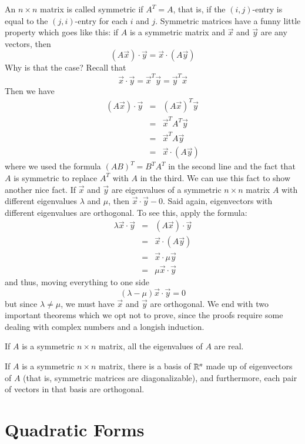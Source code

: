 \documentclass[Main.tex]{subfiles}
\begin{document}
An $n\times n$ matrix is called symmetric if $A^T=A$, that is, if the $(i,j)$-entry is equal to the $(j,i)$-entry for each $i$ and $j$.
Symmetric matrices have a funny little property which goes like this: if $A$ is a symmetric matrix and $\vec{x}$ and $\vec{y}$ are any vectors, then
\[(A\vec{x})\cdot\vec{y} = \vec{x}\cdot (A\vec{y})\]
Why is that the case?
Recall that
\[\vec{x}\cdot \vec{y} = \vec{x}^T\vec{y} = \vec{y}^T\vec{x}\]
Then we have
\begin{eqnarray*}
  (A\vec{x})\cdot\vec{y} &=& (A\vec{x})^T\vec{y} \\
  &=& \vec{x}^TA^T\vec{y}\\
  &=& \vec{x}^TA\vec{y}\\
  &=& \vec{x}\cdot (A\vec{y})
\end{eqnarray*}
where we used the formula $(AB)^T=B^TA^T$ in the second line and the fact that $A$ is symmetric to replace $A^T$ with $A$ in the third.
We can use this fact to show another nice fact.  If $\vec{x}$ and $\vec{y}$ are eigenvalues of a symmetric $n\times n$ matrix $A$ with different eigenvalues $\lambda$ and $\mu$, then $\vec{x}\cdot\vec{y}-0$.
Said again, eigenvectors with different eigenvalues are orthogonal.
To see this, apply the formula:
\begin{eqnarray*}
  \lambda\vec{x}\cdot\vec{y} &=& (A\vec{x})\cdot\vec{y}\\
  &=& \vec{x}\cdot (A\vec{y})\\
  &=& \vec{x}\cdot \mu\vec{y}\\
  &=&\mu\vec{x}\cdot\vec{y}
\end{eqnarray*}
and thus, moving everything to one side
\[(\lambda-\mu)\vec{x}\cdot\vec{y}=0\]
but since $\lambda\ne \mu$, we must have $\vec{x}$ and $\vec{y}$ are orthogonal.
We end with two important theorems which we opt not to prove, since the proofs require some dealing with complex numbers and a longish induction.
\begin{Theorem}
  If $A$ is a symmetric $n\times n$ matrix, all the eigenvalues of $A$ are real.
\end{Theorem}
\begin{Theorem}
  If $A$ is a symmetric $n\times n$ matrix, there is a basis of $\mathbb{R}^n$ made up of eigenvectors of $A$ (that is, symmetric matrices are diagonalizable), and furthermore, each pair of vectors in that basis are orthogonal.  
\end{Theorem}

\exersisest

\section{Quadratic Forms}
\end{document}
